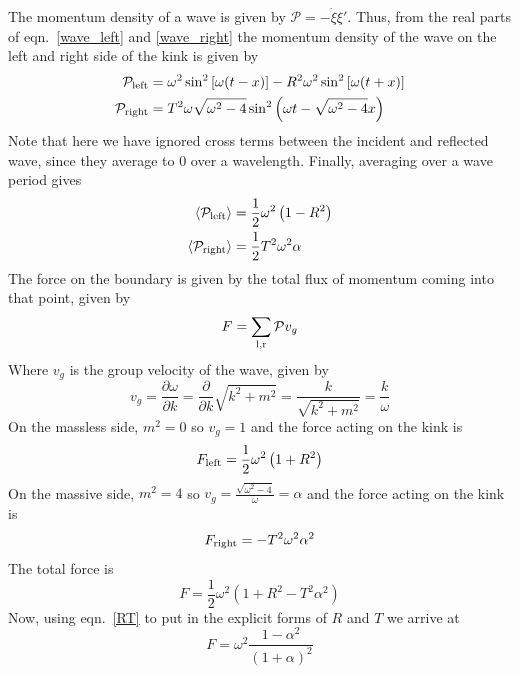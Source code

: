 \documentclass[11pt, oneside]{article}  	%
\numberwithin{equation}{section}
\begin{document}
The momentum density of a wave is given by $\mathcal{P} = -\dot{\xi}\xi'$. Thus, from the real parts of eqn.~\ref{wave_left} and \ref{wave_right} the momentum density of the wave on the left and right side of the kink is given by
\begin{align}
\mathcal{P}_\textup{left} &= \omega^2 \sin^2\left[\omega(t-x)\right] - R^2 \omega^2 \sin^2\left[\omega(t+x)\right]\\
\mathcal{P}_\textup{right} &= T^2 \omega \sqrt{\omega^2 - 4} \sin^2\left( \omega t - \sqrt{\omega^2 - 4} x\right )
\end{align}
Note that here we have ignored cross terms between the incident and reflected wave, since they average to 0 over a wavelength. Finally, averaging over a wave period gives
\begin{align}
 \left \langle \mathcal{P}_\textup{left} \right \rangle &= \frac{1}{2}\omega^2 \left ( 1 - R^2 \right) \\
 \left \langle \mathcal{P}_\textup{right} \right \rangle &= \frac{1}{2}T^2 \omega^2 \alpha
\end{align}
The force on the boundary is given by the total flux of momentum coming into that point, given by
\begin{equation}
F = \sum_\textup{l,r} \mathcal{P} v_g
\end{equation}
Where $v_g$ is the group velocity of the wave, given by
\begin{equation}
v_g = \frac{\partial \omega}{\partial k} = \frac{\partial }{\partial k} \sqrt{k^2+m^2} = \frac{k}{\sqrt{k^2+m^2}} = \frac{k}{\omega}
\end{equation}
On the massless side, $m^2 = 0$ so $v_g = 1$ and the force acting on the kink is
\begin{equation}
F_\textup{left} = \frac{1}{2}\omega^2 \left ( 1 + R^2 \right)
\end{equation}
On the massive side, $m^2 = 4$ so $v_g = \frac{\sqrt{\omega^2 - 4}}{\omega} = \alpha$ and the force acting on the kink is
\begin{equation}
F_\textup{right} = -T^2 \omega^2 \alpha^2
\end{equation}
The total force is
\begin{equation}
F = \frac{1}{2}\omega^2 \left ( 1 + R^2-T^2\alpha^2\right)
\end{equation}
Now, using eqn.~\ref{RT} to put in the explicit forms of $R$ and $T$ we arrive at
\begin{equation}
F = \omega^2 \frac{1-\alpha^2}{\left (1+\alpha \right ) ^2}
\end{equation}
\end{document}
